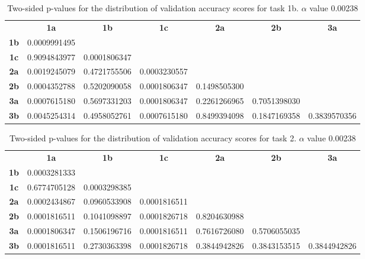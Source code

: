 \begin{table}[h!]
    \centering
    \begin{tabular}{ccccccc}
                & \textbf{1a}        & \textbf{1b}        & \textbf{1c}        & \textbf{2a}  & \textbf{2b}  & \textbf{3a}  \\
    \textbf{1b} & 0.0009991495       &                    &                    &              &              &              \\
    \textbf{1c} & 0.9094843977       & 0.0001806347       &                    &              &              &              \\
    \textbf{2a} & 0.0019245079       & 0.4721755506       & 0.0003230557       &              &              &              \\
    \textbf{2b} & 0.0004352788       & 0.5202090058       & 0.0001806347       & 0.1498505300 &              &              \\
    \textbf{3a} & 0.0007615180       & 0.5697331203       & 0.0001806347       & 0.2261266965 & 0.7051398030 &              \\
    \textbf{3b} & 0.0045254314       & 0.4958052761       & 0.0007615180       & 0.8499394098 & 0.1847169358 & 0.3839570356
    \end{tabular}
    \caption{Two-sided p-values for the distribution of validation accuracy scores for task 1b. \(\alpha\) value 0.00238}
    \label{tab:exp2.validation1b}
\end{table}

\begin{table}[h!]
    \centering
    \begin{tabular}{ccccccc}
                & \textbf{1a}        & \textbf{1b}        & \textbf{1c}        & \textbf{2a}  & \textbf{2b}  & \textbf{3a}  \\
    \textbf{1b} & 0.0003281333 &                    &                    &              &              &              \\
    \textbf{1c} & 0.6774705128 & 0.0003298385       &                    &              &              &              \\
    \textbf{2a} & 0.0002434867 & 0.0960533908       & 0.0001816511       &              &              &              \\
    \textbf{2b} & 0.0001816511 & 0.1041098897       & 0.0001826718       & 0.8204630988 &              &              \\
    \textbf{3a} & 0.0001806347 & 0.1506196716       & 0.0001816511       & 0.7616726080 & 0.5706055035 &              \\
    \textbf{3b} & 0.0001816511 & 0.2730363398       & 0.0001826718       & 0.3844942826 & 0.3843153515 & 0.3844942826
    \end{tabular}
    \caption{Two-sided p-values for the distribution of validation accuracy scores for task 2. \(\alpha\) value 0.00238}
    \label{tab:exp2.validation2}
\end{table}

